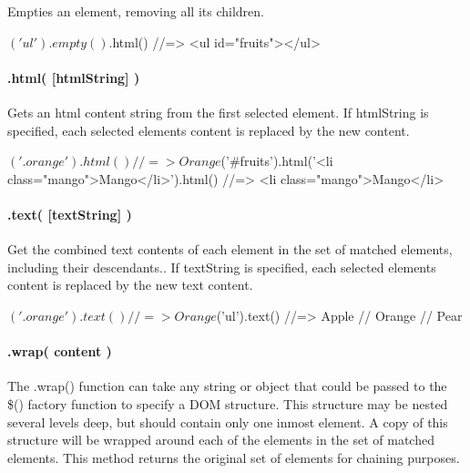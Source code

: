 Empties an element, removing all its children.


\begin{DoxyCode}
$('ul').empty()
$.html()
//=>  <ul id="fruits"></ul>
\end{DoxyCode}


\paragraph*{.html( \mbox{[}html\+String\mbox{]} )}

Gets an html content string from the first selected element. If {\ttfamily html\+String} is specified, each selected element\textquotesingle{}s content is replaced by the new content.


\begin{DoxyCode}
$('.orange').html()
//=> Orange

$('#fruits').html('<li class="mango">Mango</li>').html()
//=> <li class="mango">Mango</li>
\end{DoxyCode}


\paragraph*{.text( \mbox{[}text\+String\mbox{]} )}

Get the combined text contents of each element in the set of matched elements, including their descendants.. If {\ttfamily text\+String} is specified, each selected element\textquotesingle{}s content is replaced by the new text content.


\begin{DoxyCode}
$('.orange').text()
//=> Orange

$('ul').text()
//=>  Apple
//    Orange
//    Pear
\end{DoxyCode}


\paragraph*{.wrap( content )}

The .wrap() function can take any string or object that could be passed to the \$() factory function to specify a D\+OM structure. This structure may be nested several levels deep, but should contain only one inmost element. A copy of this structure will be wrapped around each of the elements in the set of matched elements. This method returns the original set of elements for chaining purposes.


